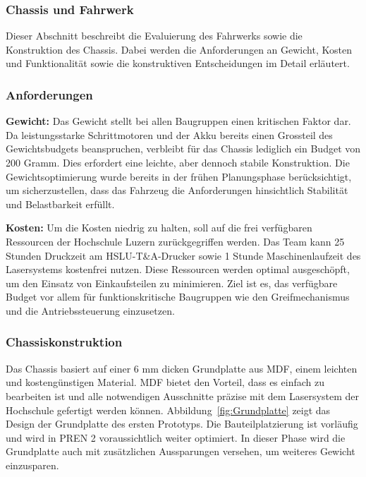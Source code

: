 \documentclass[main.tex]{subfiles} %
\begin{document}

\subsubsection{Chassis und Fahrwerk}

Dieser Abschnitt beschreibt die Evaluierung des Fahrwerks sowie die
Konstruktion des Chassis. Dabei werden die Anforderungen an Gewicht, Kosten und
Funktionalität sowie die konstruktiven Entscheidungen im Detail erläutert.

\subsubsection*{Anforderungen}

\textbf{Gewicht:} \newline
Das Gewicht stellt bei allen Baugruppen einen kritischen Faktor dar. Da
leistungsstarke Schrittmotoren und der Akku bereits einen Grossteil des
Gewichtsbudgets beanspruchen, verbleibt für das Chassis lediglich ein Budget von
200 Gramm. Dies erfordert eine leichte, aber dennoch stabile Konstruktion. Die
Gewichtsoptimierung wurde bereits in der frühen Planungsphase berücksichtigt, um
sicherzustellen, dass das Fahrzeug die Anforderungen hinsichtlich Stabilität und
Belastbarkeit erfüllt.

\textbf{Kosten:} \newline
Um die Kosten niedrig zu halten, soll auf die frei verfügbaren Ressourcen der
Hochschule Luzern zurückgegriffen werden. Das Team kann 25 Stunden Druckzeit am
HSLU-T\&A-Drucker sowie 1 Stunde Maschinenlaufzeit des Lasersystems kostenfrei
nutzen. Diese Ressourcen werden optimal ausgeschöpft, um den Einsatz von
Einkaufsteilen zu minimieren. Ziel ist es, das verfügbare Budget vor allem für
funktionskritische Baugruppen wie den Greifmechanismus und die Antriebssteuerung
einzusetzen.

\subsubsection*{Chassiskonstruktion}

Das Chassis basiert auf einer 6 mm dicken Grundplatte aus MDF, einem leichten
und kostengünstigen Material. MDF bietet den Vorteil, dass es einfach zu
bearbeiten ist und alle notwendigen Ausschnitte präzise mit dem Lasersystem der
Hochschule gefertigt werden können. Abbildung~\ref{fig:Grundplatte} zeigt das
Design der Grundplatte des ersten Prototyps. Die Bauteilplatzierung ist
vorläufig und wird in PREN 2 voraussichtlich weiter optimiert. In dieser Phase
wird die Grundplatte auch mit zusätzlichen Aussparungen versehen, um weiteres
Gewicht einzusparen.
\end{document}
